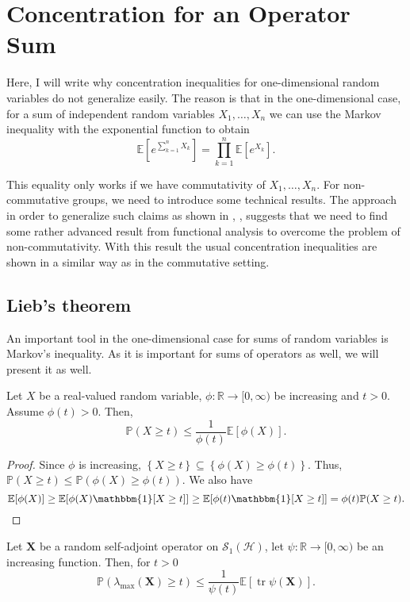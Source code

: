 \newpage

\section{Concentration for an Operator Sum}
Here, I will write why concentration inequalities for one-dimensional random variables do not generalize easily. The reason is that in the one-dimensional case, for a sum of independent random variables \( X_1,\dots,X_n \) we can use the Markov inequality with the exponential function to obtain
\[ \mathbb{E}\left[e^{\sum_{k=1}^{n} X_k}\right]= \prod_{k=1}^{n} \mathbb{E}\left[e^{X_k}\right] .\]

This equality only works if we have commutativity of \( X_1,\dots,X_n \). For non-commutative groups, we need to introduce some technical results. The approach in order to generalize such claims as shown in \cite{tropp2011user}, \cite{tropp2015introduction}, \cite{huang2020matrix} suggests that we need to find some rather advanced result from functional analysis to overcome the problem of non-commutativity. With this result the usual concentration inequalities are shown in a similar way as in the commutative setting.


\subsection{Lieb's theorem}

An important tool in the one-dimensional case for sums of random variables is Markov's inequality. As it is important for sums of operators as well, we will present it as well.

\begin{thm}
    Let \( X \) be a real-valued random variable, \( \phi: \mathbb{R} \to [0,\infty) \) be increasing and \( t > 0 \). Assume \( \phi(t)>0 \). Then,
    \[ \mathbb{P}(X \geq t)  \leq \frac{1}{\phi(t)} \mathbb{E}[\phi(X)].\]
\end{thm}

\begin{proof}
    Since \( \phi \) is increasing, \( \left\{X \geq t\right\}\subseteq \left\{\phi(X) \geq \phi(t)\right\}\). Thus, \( \mathbb{P}(X\geq t) \leq \mathbb{P}(\phi(X) \geq \phi(t)) \). We also have
    \[ \mathbb{E}[\phi(X)]  \geq \mathbb{E}[\phi(X) \mathbbm{1}[X \geq t]] \geq \mathbb{E}[\phi(t)\mathbbm{1}[X \geq t]] = \phi(t) \mathbb{P}(X\geq t).\]
\end{proof}


\begin{thm}
    Let \( \bm{X} \) be a random self-adjoint operator on \( \mathcal{S}_1 (\mathcal{H})\), let \( \psi: \mathbb{R} \to [0,\infty) \) be an increasing function. Then, for \( t>0 \)
    \[ \mathbb{P}(\lambda_{\text{max}}(\bm{X}) \geq t) \leq  \frac{1}{\psi(t)} \mathbb{E}[\operatorname{tr} \psi(\bm{X})].\]
\end{thm}

